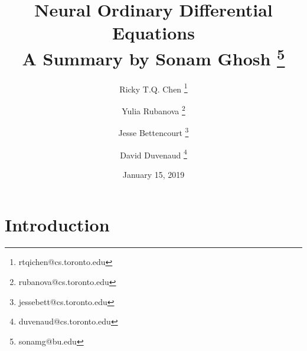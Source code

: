 \documentclass[10pt,a4paper]{article}
\title{Neural Ordinary Differential Equations \\
       \large A Summary by Sonam Ghosh \thanks{sonamg@bu.edu}}
\author[]{Ricky T.Q. Chen \thanks{rtqichen@cs.toronto.edu}}
\author[]{Yulia Rubanova \thanks{rubanova@cs.toronto.edu}}
\author[]{Jesse Bettencourt \thanks{jessebett@cs.toronto.edu}}
\author[]{David Duvenaud \thanks {duvenaud@cs.toronto.edu}}
\affil[]{University of Toronto, Vector Institute}
\date{January 15, 2019}
\begin{document}
\maketitle
\begin{comment}


\end{comment}


\section{Introduction}
\end{document}
